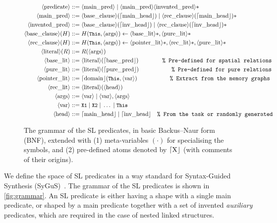 \begin{figure}[!t]
  \centering
  \[
\begin{aligned}
  \langle \text{predicate} \rangle & ::= \langle \text{main\_pred} \rangle \;|\; \langle \text{main\_pred} \rangle  \langle \text{invented\_pred} \rangle\ast \\
  \langle \text{main\_pred} \rangle & ::= \langle \text{base\_clause} \rangle(\lceil \text{main\_head} \rfloor) \;|\; \langle \text{rec\_clause} \rangle(\lceil \text{main\_head} \rfloor)\ast \\
  \langle \text{invented\_pred} \rangle & ::= \langle \text{base\_clause} \rangle(\lceil \text{inv\_head} \rfloor) \;|\; \langle \text{rec\_clause} \rangle(\lceil \text{inv\_head} \rfloor)\ast \\
  \langle \text{base\_clause} \rangle(H) & ::= H(\text{\small\ensuremath{\mathtt{This}}}, \langle \text{args} \rangle) \leftarrow \langle \text{base\_lit} \rangle\ast, \langle \text{pure\_lit} \rangle\ast \\
  \langle \text{rec\_clause} \rangle(H) & ::= H(\text{\small\ensuremath{\mathtt{This}}}, \langle \text{args} \rangle) \leftarrow \langle \text{pointer\_lit} \rangle\ast, \langle \text{rec\_lit} \rangle\ast, \langle \text{pure\_lit} \rangle\ast \\
  \langle \text{literal} \rangle(R) & ::= R(\langle \text{args} \rangle) \\
  \langle \text{base\_lit} \rangle & ::= \langle \text{literal} \rangle(\lceil \text{base\_pred} \rfloor) \qquad\qquad \texttt{\% Pre-defined  for spatial relations} \\
  \langle \text{pure\_lit} \rangle & ::= \langle \text{literal} \rangle(\lceil \text{pure\_pred} \rfloor) \qquad \qquad\enspace \quad \texttt{\% Pre-defined  for pure relations} \\
  \langle \text{pointer\_lit} \rangle & ::= \lceil \text{domain} \rfloor(\text{\small\ensuremath{\mathtt{This}}}, \langle \text{var} \rangle) \qquad\qquad\quad\enspace \texttt{\% Extract from the memory graphs} \\
  \langle \text{rec\_lit} \rangle & ::= \langle \text{literal} \rangle(\langle \text{head} \rangle) \\
  \langle \text{args} \rangle & ::= \langle \text{var} \rangle \;|\; \langle \text{var} \rangle, \langle \text{args} \rangle \\
  \langle \text{var} \rangle & ::= \text{\small\ensuremath{\mathtt{X1}}} \;|\; \text{\small\ensuremath{\mathtt{X2}}} \;|\; \dots \;|\; \text{\small\ensuremath{\mathtt{This}}} \\
  \langle \text{head} \rangle & ::= \lceil \text{main\_head} \rfloor \;|\; \lceil \text{inv\_head} \rfloor \quad \texttt{\% From the task or randomly generated}
\end{aligned}
\]
\caption{The grammar of the SL predicates, in basic Backus–Naur form
  (BNF), extended with (1) meta-variables $(\cdot)$ for specialising
  the symbols, and (2) pre-defined atoms denoted by $\lceil \text{X} \rfloor$ (with
  comments of their origins).}
  \label{fig:grammar}
\end{figure}

We define the space of SL predicates in a way standard for
Syntax-Guided Synthesis (SyGuS)~\cite{Alur-al:FMCAD13}.
%
The grammar of the SL predicates is shown in \autoref{fig:grammar}. An
SL predicate is either having a shape with a single main predicate, or
shaped by a main predicate together with a set of invented
\emph{auxiliary} predicates, which are required in the case of nested
linked structures.
%

